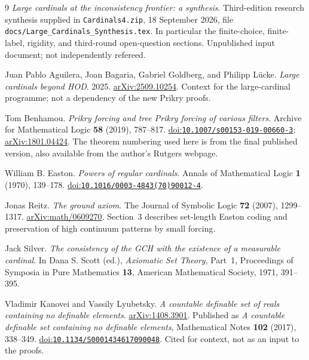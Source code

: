 \documentclass[11pt,letterpaper]{article}
\theoremstyle{definition}
\numberwithin{equation}{section}
\newcommand{\doi}[1]{\href{https://doi.org/#1}{doi:\nolinkurl{#1}}}
\newcommand{\arxiv}[1]{\href{https://arxiv.org/abs/#1}{arXiv:#1}}
\begin{document}
\clearpage
\begin{thebibliography}{9}
\emph{Large cardinals at the inconsistency frontier: a synthesis}. Third-edition research synthesis supplied in \nolinkurl{Cardinals4.zip}, 18 September 2026, file \nolinkurl{docs/Large_Cardinals_Synthesis.tex}. In particular the finite-choice, finite-label, rigidity, and third-round open-question sections. Unpublished input document; not independently refereed.

Juan Pablo Aguilera, Joan Bagaria, Gabriel Goldberg, and Philipp L\"ucke.
\emph{Large cardinals beyond HOD}. 2025. \arxiv{2509.10254}. Context for the large-cardinal programme; not a dependency of the new Prikry proofs.

Tom Benhamou. \emph{Prikry forcing and tree Prikry forcing of various filters}.
Archive for Mathematical Logic \textbf{58} (2019), 787--817.
\doi{10.1007/s00153-019-00660-3}; \arxiv{1801.04424}.
The theorem numbering used here is from the final published version, also available from the author's Rutgers webpage.

William B. Easton. \emph{Powers of regular cardinals}.
Annals of Mathematical Logic \textbf{1} (1970), 139--178.
\doi{10.1016/0003-4843(70)90012-4}.

Jonas Reitz. \emph{The ground axiom}.
The Journal of Symbolic Logic \textbf{72} (2007), 1299--1317.
\arxiv{math/0609270}. Section~3 describes set-length Easton coding and preservation of high continuum patterns by small forcing.

Jack Silver. \emph{The consistency of the GCH with the existence of a measurable cardinal}.
In Dana S. Scott (ed.), \emph{Axiomatic Set Theory}, Part~1, Proceedings of Symposia in Pure Mathematics \textbf{13}, American Mathematical Society, 1971, 391--395.

Vladimir Kanovei and Vassily Lyubetsky.
\emph{A countable definable set of reals containing no definable elements}.
\arxiv{1408.3901}. Published as \emph{A countable definable set containing no definable elements}, Mathematical Notes \textbf{102} (2017), 338--349.
\doi{10.1134/S0001434617090048}. Cited for context, not as an input to the proofs.
\end{thebibliography}
\end{document}
